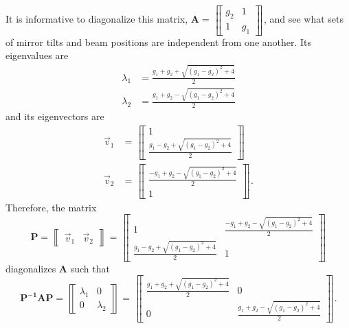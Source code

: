 It is informative to diagonalize this matrix, $\mathbf{A}
=\left\llbracket \begin{array}{cc}g_2 & 1\\1 & g_1\end{array}
\right\rrbracket $, and see what sets of mirror tilts and beam
positions are independent from one another. Its eigenvalues are
\begin{align}
\lambda_1 &= \frac{g_1 + g_2 + \sqrt{(g_1 - g_2)^2 + 4}}{2} \\
\lambda_2 &= \frac{g_1 + g_2 - \sqrt{(g_1 - g_2)^2 + 4}}{2} \label{eq:eigenvalues}
\end{align}
and its eigenvectors are
\begin{align}
\vec{v}_1 &= \left\llbracket \begin{array}{c} 
1 \\
\frac{g_1 - g_2 + \sqrt{(g_1 - g_2)^2 + 4}} {2} \end{array} \right\rrbracket\\
\vec{v}_2 &= \left\llbracket \begin{array}{c}
\frac{ -g_1 + g_2 - \sqrt{(g_1 - g_2)^2 + 4}}{2} \label{eq:eigenvectors}\\
1 \end{array} \right\rrbracket .
\end{align}
Therefore, the matrix 
\begin{equation}
\mathbf{P} = \left\llbracket \begin{array}{cc} 
\vec{v}_1 & \vec{v}_2 \end{array} \right\rrbracket =
\left\llbracket \begin{array}{cc}
 1 & \frac{-g_1 + g_2 - \sqrt{(g_1 - g_2)^2 + 4}} {2}\\
 \frac{g_1 - g_2 + \sqrt{(g_1 - g_2)^2 + 4}} {2} & 1\end{array} \right\rrbracket
\end{equation}
diagonalizes $\mathbf{A}$ such that 
\begin{equation}
\mathbf{P^{-1}AP} = \left\llbracket \begin{array}{cc} 
\lambda_1 & 0 \\
0 & \lambda_2 \end{array} \right\rrbracket = \left\llbracket \begin{array}{cc}
 \frac{g_1 + g_2 + \sqrt{(g_1 - g_2)^2 + 4}}{2}  & 0\\
 0 & \frac{g_1 + g_2 - \sqrt{(g_1 - g_2)^2 + 4}}{2}\end{array} \right\rrbracket .
\end{equation}

